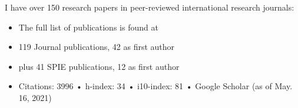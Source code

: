 
\nocite{*}


I have over 150 research papers in peer-reviewed international research journals:
\begin{itemize}
    \item The full list of publications is found at 
    \item 119
    Journal publications, 42
    as first author
    \item plus 41 SPIE publications, 12 as first author
    \item Citations: 3996  •  h-index: 34  •  i10-index: 81  •  Google Scholar (as of May. 16, 2021)
\end{itemize}


\printbibliography[heading={none}]






